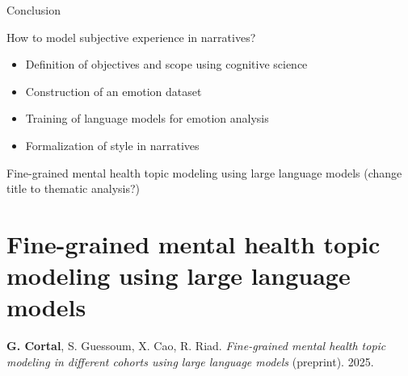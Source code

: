 \documentclass[handout,10pt]{beamer}
\begin{document}
\begin{frame}{Conclusion}

How to model subjective experience in narratives?

\vspace{0.5cm}
\pause

\begin{itemize}[<+->]
    \item Definition of objectives and scope using cognitive science
    \item Construction of an emotion dataset 
    \item Training of language models for emotion analysis 
    \item Formalization of style in narratives
\end{itemize}



    
\end{frame}

\begin{frame}{}
\Large
\begin{center}
    Fine-grained mental health topic modeling using large language models (change title to thematic analysis?)
    \section{Fine-grained mental health topic modeling using large language models}
\end{center}

\vspace{1.5cm}

\footnotesize

\textbf{G. Cortal}, S. Guessoum, X. Cao, R. Riad. \textit{Fine-grained mental health topic modeling in different cohorts using large language models} (preprint). 2025. 

\end{frame}
\end{document}
